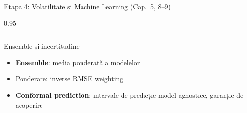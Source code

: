 \documentclass[9pt, aspectratio=169, t]{beamer}
\begin{document}
\begin{frame}{Etapa 4: Volatilitate și Machine Learning (Cap.\ 5, 8--9)}
\begin{cminipage}{0.95\textwidth}
{\begin{columns}[T]
            \vspace{0.15cm}

            \begin{block}{Ensemble și incertitudine}
                \begin{itemize}\setlength{\itemsep}{0pt}
                    \item \textbf{Ensemble}: media ponderată a modelelor
                    \item Ponderare: inverse RMSE weighting
                    \item \textbf{Conformal prediction}: intervale de predicție model-agnostice, garanție de acoperire
                \end{itemize}
            \end{block}
        \end{columns}
        }
    \end{cminipage}
\end{frame}
\end{document}
